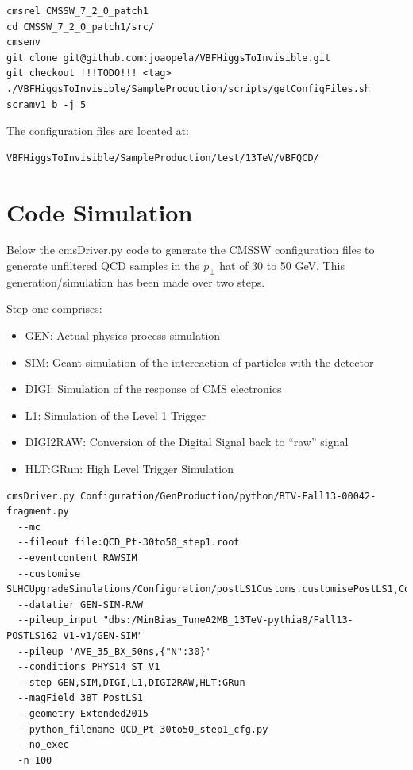 \documentclass[a4paper]{article}
\begin{document}
\lstset{
  language=bash,
  basicstyle=\footnotesize, 
  breaklines=true
}
\begin{framed}
\begin{lstlisting}
cmsrel CMSSW_7_2_0_patch1
cd CMSSW_7_2_0_patch1/src/
cmsenv
git clone git@github.com:joaopela/VBFHiggsToInvisible.git
git checkout !!!TODO!!! <tag>
./VBFHiggsToInvisible/SampleProduction/scripts/getConfigFiles.sh
scramv1 b -j 5
\end{lstlisting}
\end{framed}

The configuration files are located at:

\begin{framed}
\begin{lstlisting}
VBFHiggsToInvisible/SampleProduction/test/13TeV/VBFQCD/
\end{lstlisting}
\end{framed}

\newpage
\section{Code Simulation}

Below the cmsDriver.py code to generate the CMSSW configuration files to generate unfiltered QCD samples in the $p_\perp$ hat of 30 to 50 GeV. This generation/simulation has been made over two steps. 

Step one comprises:
\begin{itemize}
  \item GEN: Actual physics process simulation
  \item SIM: Geant simulation of the intereaction of particles with the detector
  \item DIGI: Simulation of the response of CMS electronics
  \item L1: Simulation of the Level 1 Trigger
  \item DIGI2RAW: Conversion of the Digital Signal back to ``raw'' signal
  \item HLT:GRun: High Level Trigger Simulation
\end{itemize}


\lstset{
  language=bash,
  basicstyle=\footnotesize, 
  breaklines=true
}
\begin{framed}
\begin{lstlisting}
cmsDriver.py Configuration/GenProduction/python/BTV-Fall13-00042-fragment.py 
  --mc 
  --fileout file:QCD_Pt-30to50_step1.root 
  --eventcontent RAWSIM 
  --customise SLHCUpgradeSimulations/Configuration/postLS1Customs.customisePostLS1,Configuration/StandardSequences/SimWithCastor_cff.customise 
  --datatier GEN-SIM-RAW 
  --pileup_input "dbs:/MinBias_TuneA2MB_13TeV-pythia8/Fall13-POSTLS162_V1-v1/GEN-SIM" 
  --pileup 'AVE_35_BX_50ns,{"N":30}' 
  --conditions PHYS14_ST_V1 
  --step GEN,SIM,DIGI,L1,DIGI2RAW,HLT:GRun 
  --magField 38T_PostLS1 
  --geometry Extended2015 
  --python_filename QCD_Pt-30to50_step1_cfg.py 
  --no_exec 
  -n 100
\end{lstlisting}
\end{framed}
\end{document}
